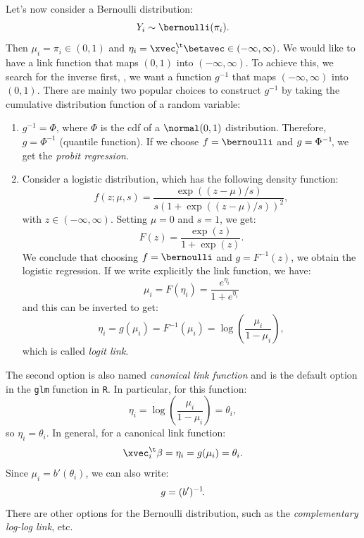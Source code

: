 Let's now consider a Bernoulli distribution:
\begin{equation}
    Y_i \sim \bernoulli(\pi_i).
\end{equation}
Then $\mu_i = \pi_i \in (0,1)$ and $\eta_i = \xvec_i^\t\betavec \in (-\infty, \infty)$. We would like to have a link function that maps $(0,1)$ into $(-\infty, \infty)$. To achieve this, we search for the inverse first, \ie, we want a function $g^{-1}$ that maps $(-\infty, \infty)$ into $(0,1)$. There are mainly two popular choices to construct $g^{-1}$ by taking the cumulative distribution function of a random variable:
\begin{enumerate}
    \item $g^{-1} = \Phi$, where $\Phi$ is the \acs{cdf} of a $\normal(0,1)$ distribution. Therefore, $g = \Phi^{-1}$ (quantile function). If we choose $f = \bernoulli$ and $g = \Phi^{-1}\negthinspace$, we get the \emph{probit regression}.
    \item Consider a logistic distribution, which has the following density function:
          \begin{equation}
              f(z; \mu, s) = \frac{\exp((z - \mu) / s)}{s(1 + \exp((z - \mu) / s))^2},
          \end{equation}
          with $z \in (-\infty, \infty)$. Setting $\mu = 0$ and $s = 1$, we get:
          \begin{equation}
              F(z) = \frac{\exp(z)}{1 + \exp(z)}.
          \end{equation}
          We conclude that choosing $f = \bernoulli$ and $g = F^{-1}(z)$, we obtain the logistic regression. If we write explicitly the link function, we have:
          \begin{equation}
              \mu_i = F(\eta_i) = \frac{e^{\eta_i}}{1 + e^{\eta_i}}
          \end{equation}
          and this can be inverted to get:
          \begin{equation}
              \eta_i = g(\mu_i) = F^{-1}(\mu_i) = \log\left(\frac{\mu_i}{1 - \mu_i}\right),
          \end{equation}
          which is called \emph{logit link}.
\end{enumerate}

The second option is also named \emph{canonical link function} and is the default option in the \texttt{glm} function in \texttt{R}. In particular, for this function:
\begin{equation}
    \eta_i = \log\left(\frac{\mu_i}{1 - \mu_i}\right) = \theta_i,
\end{equation}
so $\eta_i = \theta_i$. In general, for a canonical link function:
\begin{equation}
    \xvec_i^\t\beta = \eta_i = g(\mu_i) = \theta_i.
\end{equation}
Since $\mu_i = b'(\theta_i)$, we can also write:
\begin{equation}
    g = (b')^{-1}\negthinspace.
\end{equation}
There are other options for the Bernoulli distribution, such as the \emph{complementary log-log link}, etc.

